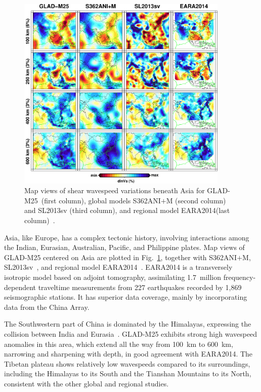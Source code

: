 \begin{figure}[ht!]
  \includegraphics[width=0.9\textwidth]{ch-GLADM25/figures/depth_slice/asia_vs.pdf}
  \caption{\small{Map views of shear wavespeed variations beneath Asia for GLAD-M25~(first column),
  global models S362ANI$+$M (second column) and SL2013sv (third column), and regional model EARA2014(last column)~\cite{chen2015multiparameter}.}}
  \label{fig:asia-vs}
  \centering
\end{figure}

Asia, like Europe, has a complex tectonic history, involving
interactions among the Indian, Eurasian, Australian, Pacific, and Philippine
plates.
Map views of GLAD-M25 centered on Asia are plotted in Fig.~\ref{fig:asia-vs},
together with S362ANI$+$M, SL2013sv~\cite{SchaefferLebedev13}, and regional model EARA2014~\cite{chen2015multiparameter}.
EARA2014 is a transversely isotropic model based on adjoint
tomography, assimilating 1.7~million frequency-dependent traveltime
measurements from 227 earthquakes recorded by 1,869 seismographic  stations.
It has superior data coverage, mainly by incorporating data from the China Array.

The Southwestern part of China is dominated by the Himalayas,
expressing the collision between India and Eurasia~\cite{lebedev2003upper}.
GLAD-M25 exhibits strong high wavespeed anomalies in this area,
which extend all the way from 100~km to 600~km, narrowing and sharpening with depth,
in good agreement with EARA2014.
The Tibetan plateau shows relatively low wavespeeds
compared to its surroundings, including the Himalayas to its South and
the Tianshan Mountains to its North, consistent with the other global
and regional studies.

